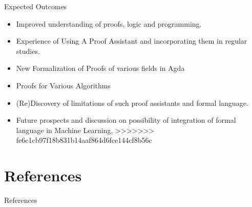 \documentclass{beamer}
\begin{document}
\begin{frame}{Expected Outcomes}
  \begin{itemize}
    \item Improved understanding of proofs, logic and programming.
    \item Experience of Using A Proof Assistant and incorporating them in regular studies.
    \item New Formalization of Proofs of various fields in Agda 
    \item Proofs for Various Algorithms
    \item (Re)Discovery of limitations of such proof assistants and formal language.
    \item Future prospects and discussion on possibility of integration of formal language in Machine Learning,
>>>>>>> fe6c1cb97f18b831b14aaf864d6fce144cf8b56c
  \end{itemize}
\end{frame}

\section{References}
\begin{frame}{References}
       
 
\end{frame}

       
\end{document}
